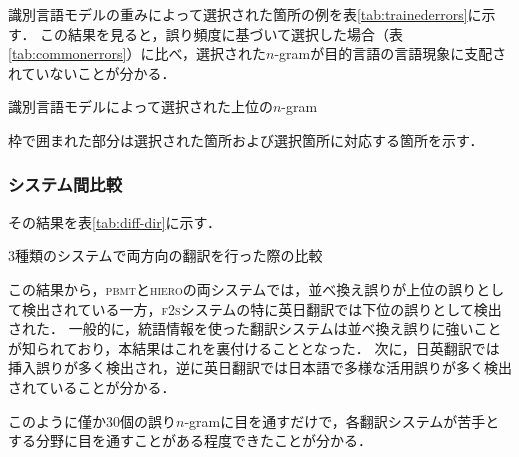 \documentclass[japanese]{jnlp_1.4}
\newcommand{\textcolor}[2]{}
\begin{document}
\textcolor{black}{
各手法とも，ランダム選択に対して捉えられた誤りの分布は大きく異なる．
この点から，別々の手法によって捉えられた誤りの分布を比較することはできないことが分かる．
また，あるシステムの分析結果に対して，どの誤りが多い，あるいは少ないという絶対的な評価はできず，
システム同士の相対的な評価にしか利用できないことに注意されたい．
}

識別言語モデルの重みによって選択された箇所の例を表\ref{tab:trainederrors}に示す．
この結果を見ると，誤り頻度に基づいて選択した場合（表\ref{tab:commonerrors}）に比べ，選択された$n$-gramが目的言語の言語現象に支配されていないことが分かる．

\begin{table}[b]
\setlength{\fboxsep}{2pt}
\caption{識別言語モデルによって選択された上位の$n$-gram}
\label{tab:trainederrors}

\par\vspace{4pt}\small
枠で囲まれた部分は選択された箇所および選択箇所に対応する箇所を示す．
\end{table}


\subsubsection{システム間比較}
\label{sec:system-comparison}

\textcolor{black}{分析対象とするシステムによって，含まれる誤りの分布が異なる．
本節では，提案法によって検出される誤りが，本来の誤り分布を適切に捉えることを確認する．
具体的には，\textsc{pbmt}，\textsc{hiero}，\textsc{f2s}の3つの翻訳システムで日英・英日の両方向に対して翻訳を行い，
単一システムの評価を行った際と同様に，識別言語モデルの重みに基づく誤り箇所選択法を利用して抽出された上位30個の誤り$n$-gramに対し，分析を行った．}
その結果を表\ref{tab:diff-dir}に示す．

\begin{table}[b]
\caption{3種類のシステムで両方向の翻訳を行った際の比較}
\label{tab:diff-dir}

\end{table}

この結果から，\textsc{pbmt}と\textsc{hiero}の両システムでは，並べ換え誤りが上位の誤りとして検出されている一方，\textsc{f2s}システムの特に英日翻訳では下位の誤りとして検出された．
一般的に，統語情報を使った翻訳システムは並べ換え誤りに強いことが知られており，本結果はこれを裏付けることとなった．
次に，日英翻訳では挿入誤りが多く検出され，逆に英日翻訳では日本語で多様な活用誤りが多く検出されていることが分かる．

このように僅か30個の誤り$n$-gramに目を通すだけで，各翻訳システムが苦手とする分野に目を通すことがある程度できたことが分かる．
\end{document}
